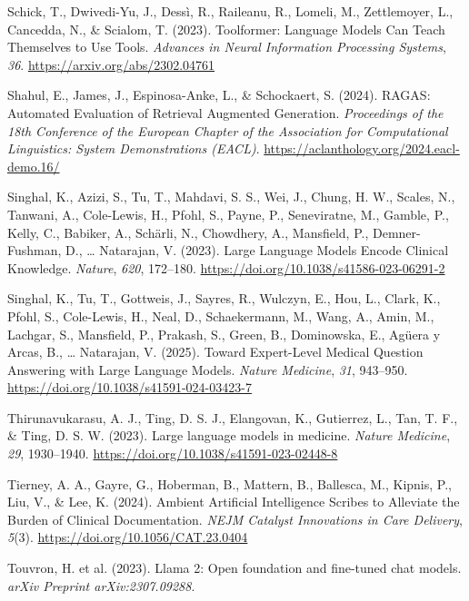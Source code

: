 \documentclass[
  letterpaper,
  11pt]{scrbook}
\newlength{\cslhangindent}
\newenvironment{CSLReferences}[2] %
 {\begin{list}{}{%
  \setlength{\itemindent}{0pt}
  \setlength{\leftmargin}{0pt}
  \setlength{\parsep}{0pt}
  \ifodd #1
   \setlength{\leftmargin}{\cslhangindent}
   \setlength{\itemindent}{-1\cslhangindent}
  \fi
  \setlength{\itemsep}{#2\baselineskip}}}
 {\end{list}}
\begin{document}
\begin{CSLReferences}{1}{0}
Schick, T., Dwivedi-Yu, J., Dessì, R., Raileanu, R., Lomeli, M.,
Zettlemoyer, L., Cancedda, N., \& Scialom, T. (2023). {Toolformer}:
{Language Models Can Teach Themselves to Use Tools}. \emph{Advances in
Neural Information Processing Systems}, \emph{36}.
\url{https://arxiv.org/abs/2302.04761}

Shahul, E., James, J., Espinosa-Anke, L., \& Schockaert, S. (2024).
{RAGAS}: {Automated Evaluation of Retrieval Augmented Generation}.
\emph{Proceedings of the 18th Conference of the European Chapter of the
Association for Computational Linguistics: System Demonstrations
(EACL)}. \url{https://aclanthology.org/2024.eacl-demo.16/}

Singhal, K., Azizi, S., Tu, T., Mahdavi, S. S., Wei, J., Chung, H. W.,
Scales, N., Tanwani, A., Cole-Lewis, H., Pfohl, S., Payne, P.,
Seneviratne, M., Gamble, P., Kelly, C., Babiker, A., Schärli, N.,
Chowdhery, A., Mansfield, P., Demner-Fushman, D., \ldots{} Natarajan, V.
(2023). {Large Language Models Encode Clinical Knowledge}.
\emph{Nature}, \emph{620}, 172--180.
\url{https://doi.org/10.1038/s41586-023-06291-2}

Singhal, K., Tu, T., Gottweis, J., Sayres, R., Wulczyn, E., Hou, L.,
Clark, K., Pfohl, S., Cole-Lewis, H., Neal, D., Schaekermann, M., Wang,
A., Amin, M., Lachgar, S., Mansfield, P., Prakash, S., Green, B.,
Dominowska, E., Agüera y Arcas, B., \ldots{} Natarajan, V. (2025).
{Toward Expert-Level Medical Question Answering with Large Language
Models}. \emph{Nature Medicine}, \emph{31}, 943--950.
\url{https://doi.org/10.1038/s41591-024-03423-7}

Thirunavukarasu, A. J., Ting, D. S. J., Elangovan, K., Gutierrez, L.,
Tan, T. F., \& Ting, D. S. W. (2023). {Large language models in
medicine}. \emph{Nature Medicine}, \emph{29}, 1930--1940.
\url{https://doi.org/10.1038/s41591-023-02448-8}

Tierney, A. A., Gayre, G., Hoberman, B., Mattern, B., Ballesca, M.,
Kipnis, P., Liu, V., \& Lee, K. (2024). {Ambient Artificial Intelligence
Scribes to Alleviate the Burden of Clinical Documentation}. \emph{NEJM
Catalyst Innovations in Care Delivery}, \emph{5}(3).
\url{https://doi.org/10.1056/CAT.23.0404}

{Touvron, H. et al.} (2023). {Llama 2}: Open foundation and fine-tuned
chat models. \emph{arXiv Preprint arXiv:2307.09288}.


\end{CSLReferences}
\end{document}
